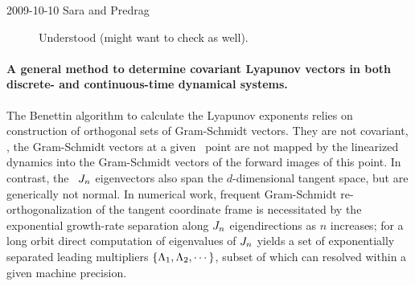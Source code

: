 \begin{description}
\item[2009-10-10 Sara and Predrag] Understood
 (might want to
check  as well).
\end{description}

\paragraph{
A general method to
determine covariant Lyapunov vectors in both discrete- and
continuous-time dynamical systems.
            }

The Benettin \etal{} algorithm to calculate the
Lyapunov exponents relies on construction of orthogonal sets of
Gram-Schmidt vectors. They  are not covariant, \ie, the
Gram-Schmidt vectors at a given \statesp\ point are not mapped
by the linearized dynamics into the Gram-Schmidt vectors of the
forward images of this point. In contrast, the \jacobianM\
$J_n$ eigenvectors \jEigvec[i] also span the
$d$-dimensional tangent space, but are generically not normal.
In numerical work, frequent Gram-Schmidt re-orthogonalization
of the tangent coordinate frame is necessitated by the
exponential growth-rate separation along $J_n$
eigendirections as $n$ increases; for a long orbit direct
computation of eigenvalues of $J_n$ yields a set of
exponentially separated leading multipliers
$\{\Lambda_1,\Lambda_2,\cdots\}$, subset of which can
resolved within a given machine precision.

